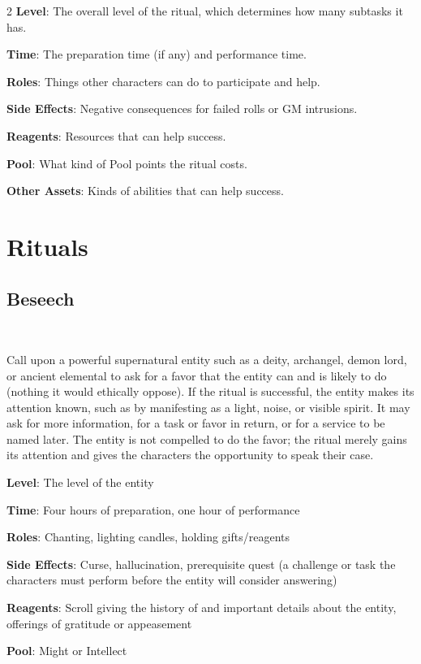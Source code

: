 \begin{multicols}{2}
\textbf{Level}: The overall level of the ritual, which determines how many subtasks it has.

\textbf{Time}: The preparation time (if any) and performance time. 

\textbf{Roles}: Things other characters can do to participate and help. 

\textbf{Side Effects}: Negative consequences for failed rolls or GM intrusions. 

\textbf{Reagents}: Resources that can help success. 

\textbf{Pool}: What kind of Pool points the ritual costs. 

\textbf{Other Assets}: Kinds of abilities that can help success.

\section{Rituals}

\subsection{Beseech} 

Call upon a powerful supernatural entity such as a deity, archangel, demon lord, or ancient elemental to ask for a favor that the entity can and is likely to do (nothing it would ethically oppose). If the ritual is successful, the entity makes its attention known, such as by manifesting as a light, noise, or visible spirit. It may ask for more information, for a task or favor in return, or for a service to be named later. The entity is not compelled to do the favor; the ritual merely gains its attention and gives the characters the opportunity to speak their case. 

\textbf{Level}: The level of the entity 

\textbf{Time}: Four hours of preparation, one hour of performance 

\textbf{Roles}: Chanting, lighting candles, holding gifts/reagents 

\textbf{Side Effects}: Curse, hallucination, prerequisite quest (a challenge or task the characters must perform before the entity will consider answering) 

\textbf{Reagents}: Scroll giving the history of and important details about the entity, offerings of gratitude or appeasement 

\textbf{Pool}: Might or Intellect 


\end{multicols}
